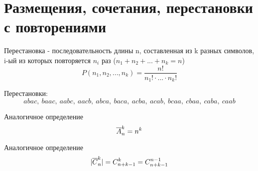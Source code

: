 \documentclass[discrete.tex]{subfiles}
\begin{document}
\section{Размещения, сочетания, перестановки с повторениями}
\begin{definition}
  Перестановка - последовательность длины n, составленная из k разных символов, i-ый из которых повторяется $n_i$ раз ($n_1 + n_2 + ... + n_k = n$)
  \[P(n_1,n_2,...,n_k) = \frac{n!}{n_1! \cdot ... \cdot n_k!}\]
\end{definition}

\begin{example}
  Перестановки:
  \[abac,\ baac,\ aabc,\ aacb,\ abca,\ baca,\ acba,\ acab,\ bcaa,\ cbaa,\ caba,\ caab\]
\end{example}

\begin{definition}
  Аналогичное определение
  \[\overline{A}_n^k = n^k\]
\end{definition}

\begin{definition}
  Аналогичное определение
  \[|\overline{C}_n^k| = C^k_{n+k-1} = C^{n-1}_{n+k-1}\]
\end{definition}
\end{document}
